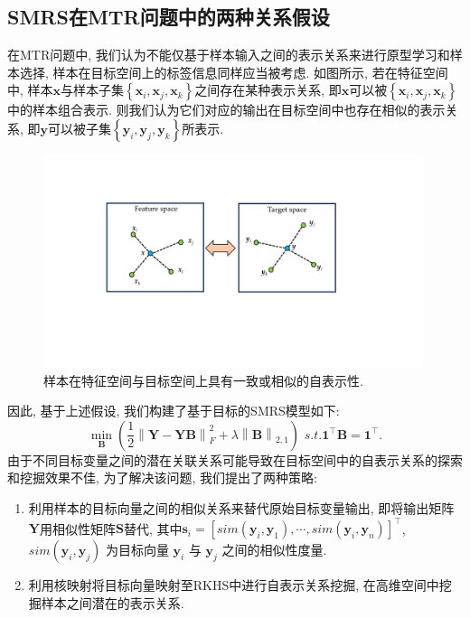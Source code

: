 \documentclass[lang=cn,10pt]{gorgeousnbook}
\numberwithin{equation}{section}%
\numberwithin{figure}{section}%
\begin{document}
\subsection{SMRS在MTR问题中的两种关系假设}
在MTR问题中, 我们认为不能仅基于样本输入之间的表示关系来进行原型学习和样本选择, 样本在目标空间上的标签信息同样应当被考虑. 如图所示, 若在特征空间中, 样本$\bm{x}$与样本子集$\left\{ \bm{x}_i,\bm{x}_j,\bm{x}_k\right\}$之间存在某种表示关系, 即$\bm{x}$可以被$\left\{ \bm{x}_i,\bm{x}_j,\bm{x}_k\right\}$中的样本组合表示. 则我们认为它们对应的输出在目标空间中也存在相似的表示关系, 即$\bm{y}$可以被子集$\left\{ \bm{y}_i,\bm{y}_j,\bm{y}_k\right\}$所表示. 
\begin{figure}
	\begin{center}
	\includegraphics[width=0.99\textwidth]{figure/fig1.pdf}%
	\caption{样本在特征空间与目标空间上具有一致或相似的自表示性.}
	\label{fig1}
\end{center}
\end{figure}
因此, 基于上述假设, 我们构建了基于目标的SMRS模型如下:
\begin{equation}
    \min_{\boldsymbol{B}} \left( \frac{1}{2}\left\| \boldsymbol{Y}-\boldsymbol{YB} \right\| _{F}^{2}+\lambda \left\| \boldsymbol{B} \right\| _{2,1} \right) \,\,s.t.\mathbf{1}^{\top}\boldsymbol{B}=\boldsymbol{1}^{\top}.
\end{equation}
由于不同目标变量之间的潜在关联关系可能导致在目标空间中的自表示关系的探索和挖掘效果不佳, 为了解决该问题, 我们提出了两种策略:
\begin{enumerate}[1)]
    \item 利用样本的目标向量之间的相似关系来替代原始目标变量输出, 即将输出矩阵$\bm{Y}$用相似性矩阵$\bm{S}$替代, 其中$\bm{s}_i = \left[ sim\left( \boldsymbol{y}_i,\boldsymbol{y}_1 \right) ,\cdots ,sim\left( \boldsymbol{y}_i,\boldsymbol{y}_n \right) \right] ^{\top}$, $sim\left(\boldsymbol{y}_i,\boldsymbol{y}_j \right)$ 为目标向量 $\boldsymbol{y}_i$ 与 $\boldsymbol{y}_j$ 之间的相似性度量. 
    \item 利用核映射将目标向量映射至RKHS中进行自表示关系挖掘, 在高维空间中挖掘样本之间潜在的表示关系. 
\end{enumerate}
\end{document}
